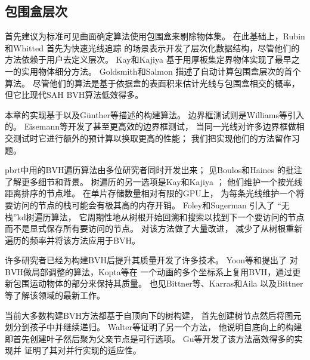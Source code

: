 \subsection{包围盒层次}\label{sub:包围盒层次}
\citet{10.1145/360349.360354}首先建议为标准可见曲面确定算法使用包围盒来剔除物体集。
在此基础上，Rubin和Whitted \parencite*{10.1145/800250.807479}首先为快速光线追踪
的场景表示开发了层次化数据结构，尽管他们的方法依赖于用户去定义层次。
Kay和Kajiya \parencite*{10.1145/15922.15916}基于用厚板集定界物体实现了最早之一的实用物体细分方法。
Goldsmith和Salmon \parencite*{4057175}描述了自动计算包围盒层次的首个算法。
尽管他们的算法是基于依据盒的表面积来估计光线与包围盒相交的概率，
但它比现代SAH BVH算法低效得多。

本章的实现基于\citet{4342588}以及Günther等\parencite*{4342598}描述的构建算法。
边界框测试则是Williams等\parencite*{10.1145/1198555.1198748}引入的。
Eisemann等\parencite*{10.1080/2151237X.2007.10129248}开发了甚至更高效的边界框测试，
当同一光线对许多边界框做相交测试时它进行额外的预计算以换取更高的性能；
我们把实现他们的方法留作习题。

pbrt中用的BVH遍历算法由多位研究者同时开发出来；
见Boulos和Haines \parencite*{bouloshaines2006}的批注了解更多细节和背景。
树遍历的另一选项是Kay和Kajiya \parencite*{10.1145/15922.15916}；
他们维护一个按光线距离排序的节点堆。
在单片存储数量相对有限的GPU上，
为每条光线维护一个将要访问的节点的栈可能会有极其高的内存开销。
Foley和Sugerman \parencite*{10.1145/1071866.1071869}引入了
“无栈”kd树遍历算法，
它周期性地从树根开始回溯和搜索以找到下一个要访问的节点而不是显式保存所有要访问的节点。
\citet{10.5555/1921479.1921496}对该方法做了大量改进，
减少了从树根重新遍历的频率并将该方法应用于BVH。

许多研究者已经为构建BVH后提升其质量开发了许多技术。
Yoon等\parencite*{10.2312:EGWR:EGSR07:073-084}和\citet{4634624}提出了
对BVH做局部调整的算法，Kopta等\parencite*{10.1145/2159616.2159649}在
一个动画的多个坐标系上复用BVH，通过更新包围运动物体的部分来保持其质量。
也见Bittner等\parencite*{BittnerFast2013}、Karras和Aila \parencite*{10.1145/2492045.2492055}
以及Bittner等\parencite*{BITTNER2015135}了解该领域的最新工作。

当前大多数构建BVH方法都基于自顶向下的树构建，
首先创建树节点然后将图元划分到孩子中并继续递归。
Walter等\parencite*{4634626}证明了另一个方法，
他说明自底向上的构建即首先创建叶子然后聚为父亲节点是可行选项。
Gu等\parencite*{10.1145/2492045.2492054}开发了该方法高效得多的实现并
证明了其对并行实现的适应性。

